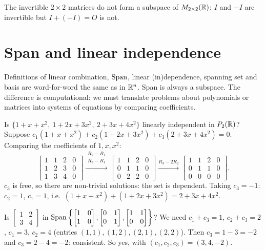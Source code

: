 \begin{example}
The invertible $2\times2$ matrices do not form a subspace of $M_{2\times 2}(\mathbb{R})$: $I$ and $-I$ are invertible but $I+(-I)=O$ is not.
\end{example}

\section{Span and linear independence}

Definitions of linear combination, $\operatorname{Span}$, linear (in)dependence, spanning set and basis are word-for-word the
same as in $\mathbb{R}^n$. Span is always a subspace. The difference is computational: we must translate
problems about polynomials or matrices into systems of equations by comparing coefficients.

\begin{example}
Is $\{1+x+x^2,\ 1+2x+3x^2,\ 2+3x+4x^2\}$ linearly independent in $P_{2}(\mathbb{R})$? Suppose
$c_1(1+x+x^2)+c_2(1+2x+3x^2)+c_3(2+3x+4x^2)=0$. Comparing the coefficients of $1,x,x^2$:
\[
\left[\begin{array}{ccc|c}1&1&2&0\\1&2&3&0\\1&3&4&0\end{array}\right]
\xrightarrow{\substack{R_2-R_1\\R_3-R_1}}
\left[\begin{array}{ccc|c}1&1&2&0\\0&1&1&0\\0&2&2&0\end{array}\right]
\xrightarrow{R_3-2R_2}
\left[\begin{array}{ccc|c}1&1&2&0\\0&1&1&0\\0&0&0&0\end{array}\right].
\]
$c_3$ is free, so there are non-trivial solutions: the set is dependent. Taking $c_3=-1$: $c_2=1$, $c_1=1$, i.e.\
$(1+x+x^2)+(1+2x+3x^2)=2+3x+4x^2$.
\end{example}

\begin{example}
Is $\begin{bmatrix}1&2\\3&4\end{bmatrix}$ in $\operatorname{Span}\left\{\begin{bmatrix}1&0\\1&0\end{bmatrix},\begin{bmatrix}0&1\\0&1\end{bmatrix},\begin{bmatrix}1&1\\0&0\end{bmatrix}\right\}$?
We need $c_1+c_3=1$, $c_2+c_3=2$, $c_1=3$, $c_2=4$ (entries $(1,1),(1,2),(2,1),(2,2)$). Then
$c_3=1-3=-2$ and $c_3=2-4=-2$: consistent. So yes, with $(c_1,c_2,c_3)=(3,4,-2)$.
\end{example}

